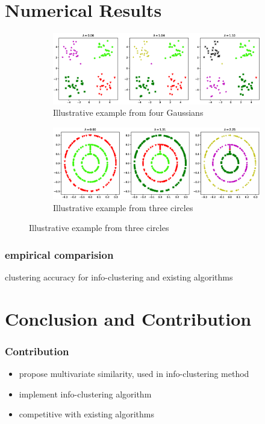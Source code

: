 \documentclass{beamer}
\begin{document}
\section{Numerical Results}
\begin{frame}
\begin{figure}[!ht]
\centering
\begin{subfigure}{\textwidth}
\includegraphics[width=12cm]{pic/4part.eps}
\caption{Illustrative example from four Gaussians}\label{fig:4p}
\end{subfigure}
\begin{subfigure}{\textwidth}
\includegraphics[width=12cm]{pic/3circle.eps}
\caption{Illustrative example from three circles}\label{fig:3c}
\end{subfigure}
\end{figure}
\end{frame}
\begin{frame}
\frametitle{empirical comparision}
\begin{table}[!ht]
\centering

\caption{clustering accuracy for info-clustering and existing algorithms}
\end{table}
\end{frame}
\section{Conclusion and Contribution}
\begin{frame}
\frametitle{Contribution}
\begin{itemize}
\item propose multivariate similarity, used in info-clustering method
\item implement info-clustering algorithm
\item competitive with existing algorithms
\end{itemize}
\end{frame}
\end{document}
